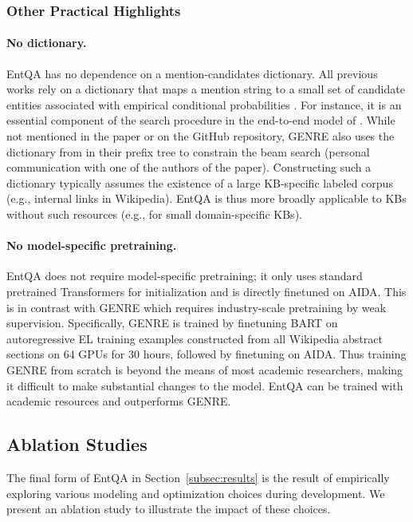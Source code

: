\documentclass{article} \clearpage{}\usepackage{amsmath,amssymb,amsthm,bbm}
\theoremstyle{definition}
\begin{document}
\subsubsection{Other Practical Highlights}

\paragraph{No dictionary.}
EntQA has no dependence on a mention-candidates dictionary.
All previous works rely on a dictionary 
that maps a mention string  to a small set of candidate entities  associated with empirical
conditional probabilities  \citep[\textit{inter alia}]{hoffart2011robust}.
For instance, it is an essential component of the search procedure in the end-to-end model of \cite{kolitsas2018end}.
While not mentioned in the paper or on the GitHub repository, GENRE \citep{cao2021autoregressive} also uses the dictionary from \cite{kolitsas2018end}
in their prefix tree to constrain the beam search (personal communication with one of the authors of the paper).
Constructing such a dictionary typically assumes the existence of a large KB-specific labeled corpus (e.g., internal links in Wikipedia).
EntQA is thus more broadly applicable to KBs without such resources (e.g., for small domain-specific KBs).

\paragraph{No model-specific pretraining.}
EntQA does not require model-specific pretraining; it only uses standard pretrained Transformers for initialization and is directly finetuned on AIDA.
This is in contrast with GENRE which requires industry-scale pretraining by weak supervision.
Specifically, GENRE is trained by finetuning BART \citep{lewis2020bart} on autoregressive EL training examples constructed from all Wikipedia abstract sections on 64 GPUs for 30 hours,
followed by finetuning on AIDA.
Thus training GENRE from scratch is beyond the means of most academic researchers, making it difficult to make substantial changes to the model.
EntQA can be trained with academic resources and outperforms GENRE.


\subsection{Ablation Studies}

The final form of EntQA in Section~\ref{subsec:results} is the result of empirically exploring various modeling and optimization choices during development.
We present an ablation study to illustrate the impact of these choices.
\end{document}
